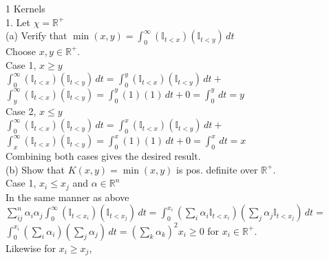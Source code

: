 \documentclass[18pt]{article}
\author{Adam Handwerger}
\begin{document}
\begin{flushleft}
1 Kernels\\
\vspace{.4cm}
1. Let $\chi=\mathbb{R}^{+} $\\
\vspace{.4cm}
(a) Verify that $ \min(x,y)=\int_{0}^\infty (\mathbb{I}_{t<x}) (\mathbb{I}_{t<y}) \,dt $\\
\vspace{.4cm}
Choose $x,y \in \mathbb{R}^{+}$.\\
\vspace{.4cm}
Case 1, $x \geq y$\\
\vspace{.4cm}
$\int_{0}^{\infty} (\mathbb{I}_{t<x}) (\mathbb{I}_{t<y}) \,dt=\int_{0}^{y} (\mathbb{I}_{t<x}) (\mathbb{I}_{t<y}) \,dt+$\\
$\int_{y}^{\infty} (\mathbb{I}_{t<x}) (\mathbb{I}_{t<y})=\int_{0}^{y} (1)(1) \,dt +0= \int_{0}^{y} \,dt=y$\\
\vspace{.4cm}
Case 2, $ x\leq y$\\
\vspace{.4cm}
$\int_{0}^{\infty} (\mathbb{I}_{t<x}) (\mathbb{I}_{t<y}) \,dt=\int_{0}^{x} (\mathbb{I}_{t<x}) (\mathbb{I}_{t<y}) \,dt+$\\
$\int_{x}^{\infty} (\mathbb{I}_{t<x}) (\mathbb{I}_{t<y})=\int_{0}^{x} (1)(1) \,dt +0= \int_{0}^{x} \,dt=x$\\
\vspace{.4cm}
Combining both cases gives the desired result.\\
\vspace{.4cm}
(b) Show that $K(x,y)=\min(x,y)$ is pos. definite over $\mathbb{R}^{+}$.\\
\vspace{.4cm}
Case 1, $x_i \leq x_j$ and $\alpha\in\mathbb{R}^n$\\
\vspace{.4cm}
In the same manner as above\\
\vspace{.4cm}
$\sum_{ij}^n \alpha_i \alpha_j \int_{0}^{\infty} (\mathbb{I}_{t<x_i}) (\mathbb{I}_{t<x_j}) \,dt=\int_{0}^{x_i} (\sum_i \alpha_i \mathbb{I}_{t<x_i}) (\sum_j \alpha_j \mathbb{I}_{t<x_j}) \,dt=$\\
$\int_0^{x_i} (\sum_i \alpha_i)(\sum_j \alpha_j) \,dt=(\sum_k \alpha_k)^2 x_i \geq 0$ for $x_i \in \mathbb{R}^{+}$.\\
\vspace{.4cm}
Likewise for $ x_i \geq x_j$,\\

\end{flushleft}
\end{document}
